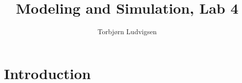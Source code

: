 \documentclass[12pt,a4paper]{article}
\begin{document}
\title{Modeling and Simulation, Lab 4}
\author{Torbjørn Ludvigsen}


\newpage
\tableofcontents
\newpage

\section{Introduction}
\end{document}
